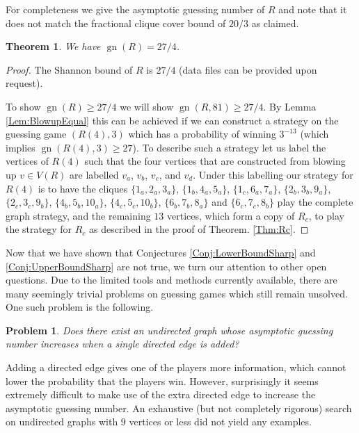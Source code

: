\documentclass[a4paper, 14pt]{extarticle}
\theoremstyle{plain}
\newtheorem{theorem}[proposition]{Theorem}
\newtheorem{problem}[proposition]{Problem}
\DeclareMathOperator{\gn}{gn}
\begin{document}
For completeness we give the asymptotic guessing number of $R$ and
note that it does not match the fractional clique cover bound of
$20/3$ as claimed.

\begin{theorem}
We have $\gn(R) = 27/4$.
\end{theorem}

\begin{proof}
The Shannon bound of $R$ is $27/4$ (data files can be provided upon
request).

To show $\gn(R)\geq 27/4$ we will show $\gn(R,81)\geq 27/4$. By
Lemma \ref{Lem:BlowupEqual} this can be achieved if we can construct
a strategy on the guessing game $(R(4),3)$ which has a probability
of winning $3^{-13}$ (which implies $\gn(R(4),3)\geq 27$). To describe
such a strategy let us label the vertices of $R(4)$ such that the
four vertices that are constructed from blowing up $v\in V(R)$ are
labelled $v_a$, $v_b$, $v_c$, and $v_d$. Under this labelling our
strategy for $R(4)$ is to have the cliques $\{1_a,2_a,3_a\}$,
$\{1_b,4_a,5_a\}$, $\{1_c,6_a,7_a\}$, $\{2_b,3_b,9_a\}$,
$\{2_c,3_c,9_b\}$, $\{4_b,5_b,10_a\}$, $\{4_c,5_c,10_b\}$,
$\{6_b,7_b,8_a\}$ and $\{6_c,7_c,8_b\}$ play the complete graph
strategy, and the remaining $13$ vertices, which form a copy of $R_c$,
to play the strategy for $R_c$ as described in the proof of Theorem.
\ref{Thm:Rc}.
\end{proof}

Now that we have shown that Conjectures \ref{Conj:LowerBoundSharp} and
\ref{Conj:UpperBoundSharp} are not true, we turn our attention to
other open questions. Due to the limited tools and methods currently
available, there are many seemingly trivial problems on guessing
games which still remain unsolved. One such problem is the
following.

\begin{problem}\label{Prob:SingleEdge}
Does there exist an undirected graph whose asymptotic guessing
number increases when a single directed edge is added?
\end{problem}

Adding a directed edge gives one of the players more information,
which cannot lower the probability that the players win. However,
surprisingly it seems extremely difficult to make use of the extra
directed edge to increase the asymptotic guessing number. An
exhaustive (but not completely rigorous) search on undirected graphs
with $9$ vertices or less did not yield any examples.
\end{document}
